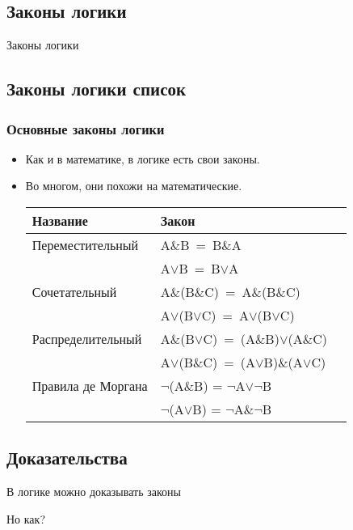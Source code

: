 \documentclass[compress,red]{beamer}
\begin{document}
\subsection{Законы логики}
\begin{frame}
  \begin{center}
    \Huge{Законы логики}
  \end{center}
\end{frame}

\subsection{Законы логики список}
\begin{frame}[fragile]
  \frametitle{Основные законы логики}
  \begin{itemize}
    \item Как и в математике, в логике есть свои законы.
    \item Во многом, они похожи на математические.
    
    \begin{tabular}{|l|l|l|}
      \hline
      Название & Закон \\
      \hline
      Переместительный & A$\&$B~=~B$\&$A \\ 
                       & A$\vee$B~=~B$\vee$A \\
      \hline
      Сочетательный & A$\&$(B$\&$C)~=~A$\&$(B$\&$C) \\
                    & A$\vee$(B$\vee$C)~=~A$\vee$(B$\vee$C) \\
      \hline
      Распределительный & A$\&$(B$\vee$C)~=~(A$\&$B)$\vee$(A$\&$C) \\
                    & A$\vee$(B$\&$C)~=~(A$\vee$B)$\&$(A$\vee$C) \\
      \hline
      Правила де Моргана & ${\neg}$(A$\&$B) = ${\neg}$A$\vee$${\neg}$B \\
                         & ${\neg}$(A$\vee$B) = ${\neg}$A$\&$${\neg}$B \\
      \hline
    \end{tabular}
  \end{itemize}
\end{frame}

\subsection{Доказательства}
\begin{frame}
  \begin{center}
    \Large{В логике можно доказывать законы}
  \end{center}
  \begin{center}
    \Huge{Но как?}
  \end{center}
\end{frame}
\end{document}
